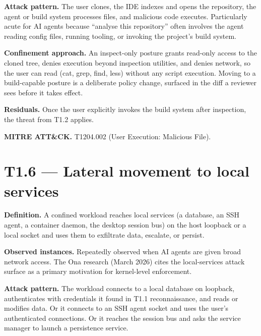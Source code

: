 \textbf{Attack pattern.} The user clones, the IDE indexes and opens the
repository, the agent or build system processes files, and malicious
code executes. Particularly acute for AI agents because ``analyse this
repository'' often involves the agent reading config files, running
tooling, or invoking the project's build system.

\textbf{Confinement approach.} An inspect-only posture grants read-only
access to the cloned tree, denies execution beyond inspection utilities,
and denies network, so the user can read (cat, grep, find, less) without
any script execution. Moving to a build-capable posture is a deliberate
policy change, surfaced in the diff a reviewer sees before it takes
effect.

\textbf{Residuals.} Once the user explicitly invokes the build system
after inspection, the threat from T1.2 applies.

\textbf{MITRE ATT\&CK.} T1204.002 (User Execution: Malicious File).

\hypertarget{t1.6-lateral-movement-to-local-services}{%
\section{T1.6 --- Lateral movement to local
services}\label{t1.6-lateral-movement-to-local-services}}

\textbf{Definition.} A confined workload reaches local services (a
database, an SSH agent, a container daemon, the desktop session bus) on
the host loopback or a local socket and uses them to exfiltrate data,
escalate, or persist.

\textbf{Observed instances.} Repeatedly observed when AI agents are
given broad network access. The Ona research (March 2026) cites the
local-services attack surface as a primary motivation for kernel-level
enforcement.

\textbf{Attack pattern.} The workload connects to a local database on
loopback, authenticates with credentials it found in T1.1
reconnaissance, and reads or modifies data. Or it connects to an SSH
agent socket and uses the user's authenticated connections. Or it
reaches the session bus and asks the service manager to launch a
persistence service.

